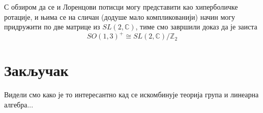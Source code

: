 \documentclass{report}
\theoremstyle{plain}
\theoremstyle{definition}
\begin{document}
С обзиром да се и Лоренцови потисци могу представити као хиперболичке ротације, и њима се на сличан (додуше мало компликованији) начин могу придружити по две матрице из $SL(2, \mathbb{C})$, тиме смо завршили доказ да је заиста
$$SO(1, 3)^+\cong SL(2, \mathbb{C})/\mathbb{Z}_2$$


\chapter{Закључак}

Видели смо како је то интересантно кад се искомбинује теорија група и линеарна алгебра...

\nocite{*}


\end{document}
